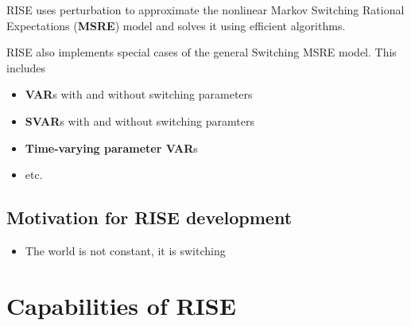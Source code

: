 \documentclass[letterpaper,10pt,english]{sphinxmanual}
\begin{document}
RISE uses perturbation to approximate the nonlinear Markov Switching Rational
Expectations (\textbf{MSRE}) model and solves it using efficient algorithms.

RISE also implements special cases of the general Switching MSRE model. This includes
\begin{itemize}
\item {} 
\textbf{VAR}s with and without switching parameters

\item {} 
\textbf{SVAR}s with and without switching paramters

\item {} 
\textbf{Time-varying parameter VAR}s

\item {} 
etc.

\end{itemize}


\subsection{Motivation for RISE development}
\label{intro_folder/rise_at_a_glance:motivation-for-rise-development}\begin{itemize}
\item {} 
The world is not constant, it is switching

\end{itemize}


\section{Capabilities of RISE}
\label{intro_folder/rise_capabilities::doc}\label{intro_folder/rise_capabilities:capabilities-of-rise}
\end{document}
